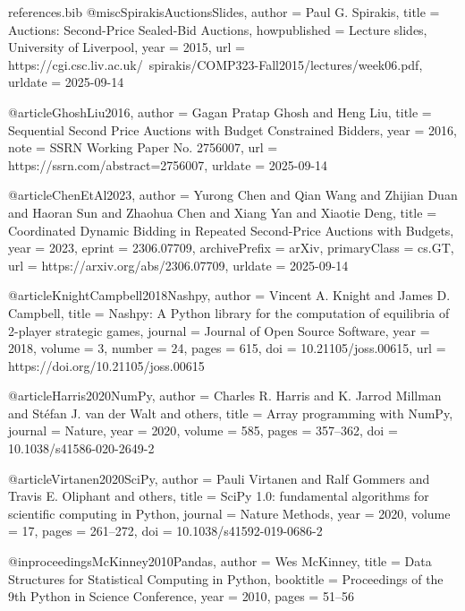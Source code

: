 \begin{filecontents*}{references.bib}
@misc{SpirakisAuctionsSlides,
  author    = {Paul G. Spirakis},
  title     = {Auctions: Second-Price Sealed-Bid Auctions},
  howpublished = {Lecture slides, University of Liverpool},
  year      = {2015},
  url       = {https://cgi.csc.liv.ac.uk/~spirakis/COMP323-Fall2015/lectures/week06.pdf},
  urldate   = {2025-09-14}
}

@article{GhoshLiu2016,
  author    = {Gagan Pratap Ghosh and Heng Liu},
  title     = {Sequential Second Price Auctions with Budget Constrained Bidders},
  year      = {2016},
  note      = {SSRN Working Paper No. 2756007},
  url       = {https://ssrn.com/abstract=2756007},
  urldate   = {2025-09-14}
}

@article{ChenEtAl2023,
  author    = {Yurong Chen and Qian Wang and Zhijian Duan and Haoran Sun and Zhaohua Chen and Xiang Yan and Xiaotie Deng},
  title     = {Coordinated Dynamic Bidding in Repeated Second-Price Auctions with Budgets},
  year      = {2023},
  eprint    = {2306.07709},
  archivePrefix = {arXiv},
  primaryClass  = {cs.GT},
  url       = {https://arxiv.org/abs/2306.07709},
  urldate   = {2025-09-14}
}

@article{KnightCampbell2018Nashpy,
  author    = {Vincent A. Knight and James D. Campbell},
  title     = {Nashpy: A Python library for the computation of equilibria of 2-player strategic games},
  journal   = {Journal of Open Source Software},
  year      = {2018},
  volume    = {3},
  number    = {24},
  pages     = {615},
  doi       = {10.21105/joss.00615},
  url       = {https://doi.org/10.21105/joss.00615}
}

@article{Harris2020NumPy,
  author    = {Charles R. Harris and K. Jarrod Millman and St{\'e}fan J. van der Walt and others},
  title     = {Array programming with NumPy},
  journal   = {Nature},
  year      = {2020},
  volume    = {585},
  pages     = {357--362},
  doi       = {10.1038/s41586-020-2649-2}
}

@article{Virtanen2020SciPy,
  author    = {Pauli Virtanen and Ralf Gommers and Travis E. Oliphant and others},
  title     = {SciPy 1.0: fundamental algorithms for scientific computing in Python},
  journal   = {Nature Methods},
  year      = {2020},
  volume    = {17},
  pages     = {261--272},
  doi       = {10.1038/s41592-019-0686-2}
}

@inproceedings{McKinney2010Pandas,
  author    = {Wes McKinney},
  title     = {Data Structures for Statistical Computing in Python},
  booktitle = {Proceedings of the 9th Python in Science Conference},
  year      = {2010},
  pages     = {51--56}
}


\end{filecontents*}

